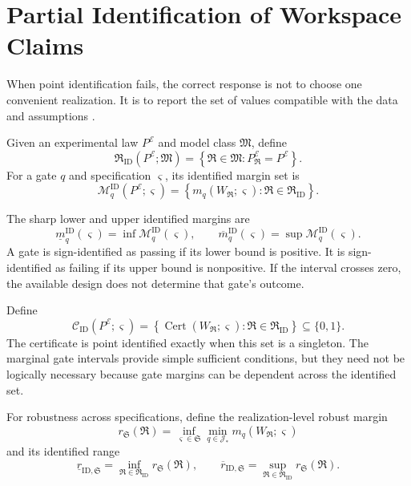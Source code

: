 \section{Partial Identification of Workspace Claims}

When point identification fails, the correct response is not to choose one
convenient realization. It is to report the set of values compatible with the
data and assumptions \cite{SRWT:Manski2003,SRWT:ImbensManski2004}.

\begin{SRWTdefinition}
\label{SRWT:def:identified-realization-set}
Given an experimental law \(P^{\mathcal E}\) and model class \(\mathfrak M\),
define
\[
\boxed{
\mathfrak R_{\mathrm{ID}}
(P^{\mathcal E};\mathfrak M)
=
\left\{
\mathfrak R\in\mathfrak M:
P_{\mathfrak R}^{\mathcal E}=P^{\mathcal E}
\right\}.
}
\]
For a gate \(q\) and specification \(\varsigma\), its identified margin set is
\[
\mathcal M_q^{\mathrm{ID}}
(P^{\mathcal E};\varsigma)
=
\left\{
 m_q(W_{\mathfrak R};\varsigma):
\mathfrak R\in\mathfrak R_{\mathrm{ID}}
\right\}.
\]
\end{SRWTdefinition}

The sharp lower and upper identified margins are
\[
\underline m_q^{\mathrm{ID}}(\varsigma)
=
\inf\mathcal M_q^{\mathrm{ID}}(\varsigma),
\qquad
\overline m_q^{\mathrm{ID}}(\varsigma)
=
\sup\mathcal M_q^{\mathrm{ID}}(\varsigma).
\]
A gate is sign-identified as passing if its lower bound is positive. It is
sign-identified as failing if its upper bound is nonpositive. If the interval
crosses zero, the available design does not determine that gate's outcome.


Define
\[
\boxed{
\mathcal C_{\mathrm{ID}}
(P^{\mathcal E};\varsigma)
=
\left\{
\operatorname{Cert}(W_{\mathfrak R};\varsigma):
\mathfrak R\in\mathfrak R_{\mathrm{ID}}
\right\}
\subseteq\{0,1\}.
}
\]
The certificate is point identified exactly when this set is a singleton. The
marginal gate intervals provide simple sufficient conditions, but they need
not be logically necessary because gate margins can be dependent across the
identified set.

For robustness across specifications, define the realization-level robust
margin
\[
r_{\mathfrak S}(\mathfrak R)
=
\inf_{\varsigma\in\mathfrak S}
\min_{q\in\mathcal J_*}
 m_q(W_{\mathfrak R};\varsigma)
\]
and its identified range
\[
\underline r_{\mathrm{ID},\mathfrak S}
=
\inf_{\mathfrak R\in\mathfrak R_{\mathrm{ID}}}
 r_{\mathfrak S}(\mathfrak R),
\qquad
\overline r_{\mathrm{ID},\mathfrak S}
=
\sup_{\mathfrak R\in\mathfrak R_{\mathrm{ID}}}
 r_{\mathfrak S}(\mathfrak R).
\]

